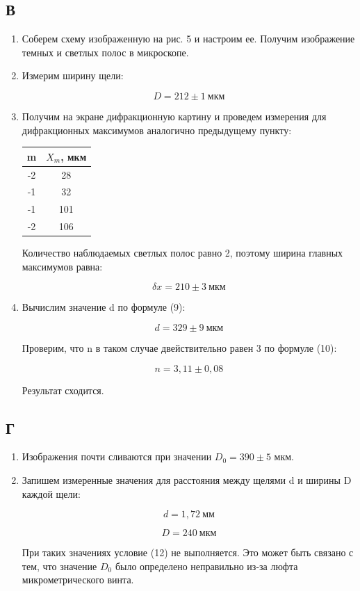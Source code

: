 \documentclass[a4paper, 12pt]{article}%
\begin{document}
\subsection*{В}

\begin{enumerate}

\item Соберем схему изображенную на рис. 5 и настроим ее. Получим изображение темных и светлых полос в микроскопе.

\item Измерим ширину щели:

\[D = 212 \pm 1 \: \text{мкм}\]

\item Получим на экране дифракционную картину и проведем измерения для дифракционных максимумов аналогично предыдущему пункту:

\begin{center}
\begin{tabular}{|c|c|}
\hline 
m & $X_m$, мкм \\ 
\hline 
-2 & 28 \\ 
\hline 
-1 & 32 \\ 
\hline 
-1 & 101 \\ 
\hline 
-2 & 106\\ 
\hline 
\end{tabular} 
\end{center}

Количество наблюдаемых светлых полос равно 2, поэтому ширина главных максимумов равна:

\[\delta x = 210 \pm 3 \: \text{мкм}\]

\item Вычислим значение d по формуле (9):

\[d = 329 \pm 9 \: \text{мкм}\]

Проверим, что n в таком случае двействительно равен 3 по формуле (10):

\[n = 3,11 \pm 0,08\]

Результат сходится.

\end{enumerate}

\subsection*{Г}

\begin{enumerate}

\item Изображения почти сливаются при значении $D_0 = 390 \pm 5$ мкм.

\item Запишем измеренные значения для расстояния между щелями d и ширины D каждой щели:

\[d = 1,72 \: \text{мм}\]

\[D = 240 \: \text{мкм}\]

При таких значениях условие (12) не выполняется. Это может быть связано с тем, что значение $D_0$ было определено неправильно из-за люфта микрометрического винта.

\end{enumerate}
\end{document}

